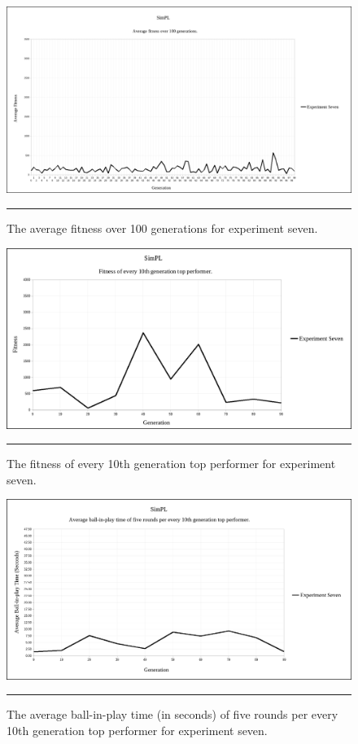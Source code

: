 \begin{figure}[ht!]  
  \centering
  \includegraphics[width=5in]{../Figures/Chapter3/exp7_avg_fit.png}
  \rule{35em}{0.5pt}
  \caption[Experiment Seven Average Fitness]{The average fitness over 100 generations for experiment seven.}
  \label{fig:exp7_avg_fit}
\end{figure}

\begin{figure}[ht!]  
  \centering
  \includegraphics[width=5in]{../Figures/Chapter3/exp7_10_tops.png}
  \rule{35em}{0.5pt}
  \caption[Experiment Seven Top Performers]{The fitness of every 10th generation top performer for experiment seven.}
  \label{fig:exp7_10_tops}
\end{figure}

\begin{figure}[ht!]  
  \centering
  \includegraphics[width=5in]{../Figures/Chapter3/exp7_10_tops_times.png}
  \rule{35em}{0.5pt}
  \caption[Experiment Seven Top Performers Tournament]{The average ball-in-play time (in seconds) of five rounds per every 10th generation top performer for experiment seven.}
  \label{fig:exp7_10_tops_times}
\end{figure}

